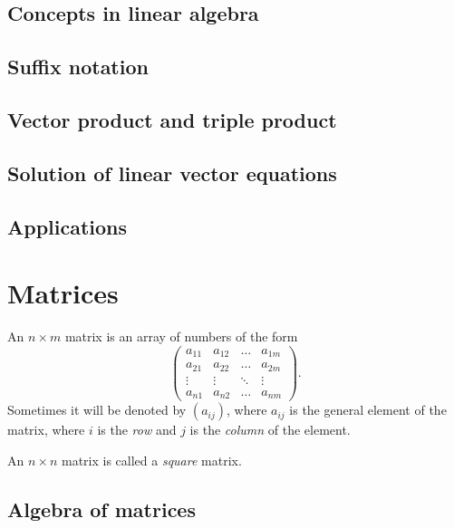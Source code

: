 \documentclass[main.tex]{subfiles}
\begin{document}
		\subsection{Concepts in linear algebra}
		
		\subsection{Suffix notation}
		
		\subsection{Vector product and triple product}
		
		\subsection{Solution of linear vector equations}
		
		\subsection{Applications}
		
	\section{Matrices}
		\begin{definition}
			An $n \times m$ matrix is an array of numbers of the form
			\begin{equation*}
				\begin{pmatrix}
				a_{11} & a_{12} & \ldots & a_{1m} \\
				a_{21} & a_{22} & \ldots & a_{2m} \\
				\vdots & \vdots & \ddots & \vdots \\
				a_{n1} & a_{n2} & \ldots & a_{nm}
				\end{pmatrix}.
			\end{equation*}
			Sometimes it will be denoted by $(a_{ij})$, where $a_{ij}$ is the general element of the matrix, where $i$ is the \textit{row} and $j$ is the \textit{column} of the element.
		\end{definition}
			\begin{definition}
				An $n \times n$ matrix is called a \textit{square} matrix.
			\end{definition}
		\subsection{Algebra of matrices}
		
\end{document}
